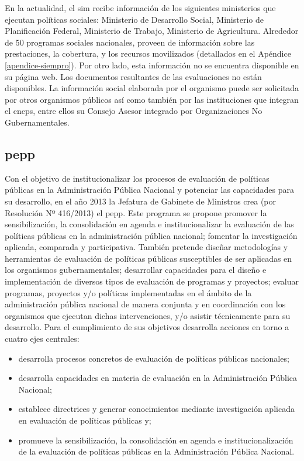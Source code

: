 En la actualidad, el \ac{sim} recibe información de los siguientes ministerios que ejecutan políticas sociales: Ministerio de Desarrollo Social, Ministerio de Planificación Federal, Ministerio de Trabajo, Ministerio de Agricultura. Alrededor de 50 programas sociales nacionales, proveen de información sobre las prestaciones, la cobertura, y los recursos movilizados (detallados en el Apéndice \ref{apendice-siempro}). Por otro lado, esta información no se encuentra disponible en su página web. Los documentos resultantes de las evaluaciones no están disponibles. La información social elaborada por el organismo puede ser solicitada por otros organismos públicos así como también por las instituciones que integran el \ac{cncps}, entre ellos su Consejo Asesor integrado por Organizaciones No Gubernamentales.

\subsection{\acrlong{pepp}}

Con el objetivo de institucionalizar los procesos de evaluación de políticas públicas en la Administración Pública Nacional y potenciar las capacidades para su desarrollo, en el año 2013 la Jefatura de Gabinete de Ministros crea (por Resolución Nº 416/2013)  el \acrfull{pepp}.
Este programa se propone promover la sensibilización, la consolidación en agenda e institucionalizar la evaluación de las políticas públicas en la administración pública nacional; fomentar la investigación aplicada, comparada y participativa. También pretende diseñar metodologías y herramientas de evaluación de políticas públicas susceptibles de ser aplicadas en los organismos gubernamentales; desarrollar capacidades para el diseño e implementación de diversos tipos de evaluación de programas y proyectos; evaluar programas, proyectos y/o políticas implementadas en el ámbito de la administración pública nacional de manera conjunta y en coordinación con los organismos que ejecutan dichas intervenciones, y/o asistir técnicamente para su desarrollo.
Para el cumplimiento de sus objetivos desarrolla acciones en torno a cuatro ejes centrales:

    \begin{itemize}
        \item desarrolla procesos concretos de evaluación de políticas públicas nacionales; 
        \item desarrolla capacidades en materia de evaluación en la Administración Pública Nacional; 
        \item establece directrices y generar conocimientos mediante investigación aplicada en evaluación de políticas públicas y; 
        \item promueve la sensibilización, la consolidación en agenda e institucionalización de la evaluación de políticas públicas en la Administración Pública Nacional.
    \end{itemize}

